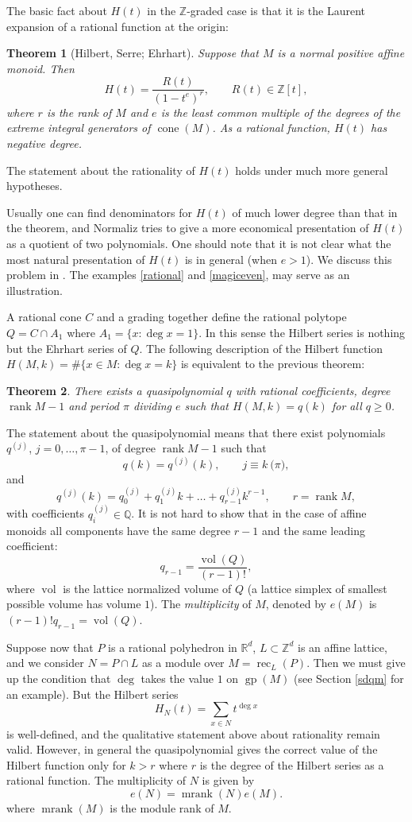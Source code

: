 \documentclass[12pt,a4paper]{scrartcl}
\newtheorem{theorem}{Theorem}
\theoremstyle{definition}
\def\ZZ{{\mathbb Z}}
\def\QQ{{\mathbb Q}}
\def\RR{{\mathbb R}}
\DeclareMathOperator{\gp}{gp}
\DeclareMathOperator{\rank}{rank}
\DeclareMathOperator{\cone}{cone}
\DeclareMathOperator{\rec}{rec}
\DeclareMathOperator{\mrank}{mrank}
\DeclareMathOperator{\vol}{vol}
\begin{document}
The basic fact about $H(t)$ in the $\ZZ$-graded case is that it
is the Laurent expansion of a rational function at the origin:
\begin{theorem}[Hilbert, Serre; Ehrhart]
	Suppose that $M$ is a normal positive affine monoid. Then
	$$
	H(t)=\frac{R(t)}{(1-t^e)^r},\qquad R(t)\in\ZZ[t], %
	$$
	where $r$ is the rank of $M$ and $e$ is the least common multiple
	of the degrees of the extreme integral generators of $\cone(M)$. As a rational function, $H(t)$ has negative degree.
\end{theorem}

The statement about the rationality of $H(t)$ holds under much more general hypotheses.

Usually one can find denominators for $H(t)$ of much lower
degree than that in the theorem, and Normaliz tries to
give a more economical presentation of $H(t)$ as a quotient of
two polynomials. One should note that it is not clear what the
most natural presentation of $H(t)$ is in general (when $e>1$).
We discuss this problem in \cite[Section 4]{BIS}. The examples \ref{rational} and \ref{magiceven}, may serve as
an illustration.

A rational cone $C$ and a grading together define the rational
polytope $Q=C\cap A_1$ where $A_1=\{x:\deg x=1\}$. In this
sense the Hilbert series is nothing but the Ehrhart series of
$Q$.
The following description of the Hilbert function $H(M,k)=\#\{x\in M: \deg x=k\}$ is equivalent to the previous theorem:

\begin{theorem}
	There exists a quasipolynomial $q$ with rational coefficients, degree $\rank M-1$ and period $\pi$ dividing $e$ such that $H(M,k)=q(k)$ for all $q\ge0$.
\end{theorem}

The statement about the quasipolynomial means that there exist
polynomials $q^{(j)}$, $j=0,\dots,\pi-1$, of degree $\rank M-1$ such that
$$
q(k)=q^{(j)}(k),\qquad j\equiv k\pod \pi,
$$
and
$$
q^{(j)}(k)=q^{(j)}_0+q^{(j)}_1k+\dots+q^{(j)}_{r-1}k^{r-1},\qquad r=\rank M,
$$
with coefficients $q^{(j)}_i\in \QQ$. It is not hard to show that in the case of affine monoids all components have the same degree $r-1$ and the same leading coefficient:
$$
q_{r-1}=\frac{\vol(Q)}{(r-1)!},
$$
where $\vol$ is the lattice normalized volume of $Q$ (a lattice simplex of smallest possible volume has volume $1$). The \emph{multiplicity} of $M$, denoted by $e(M)$ is $(r-1)!q_{r-1}=\vol(Q)$.

Suppose now that $P$ is a rational polyhedron in $\RR^d$, $L\subset\ZZ^d$ is an affine lattice, and we consider $N=P\cap L$ as a module over $M=\rec_L(P)$. Then we must give up the condition that $\deg$ takes the value $1$ on $\gp(M)$ (see Section \ref{sdqm} for an example). But the Hilbert series
$$
H_N(t)=\sum_{x\in N} t^{\deg x}
$$
is well-defined, and the qualitative statement above about rationality remain valid. However, in general the quasipolynomial gives the correct value of the Hilbert function only for $k>r$ where $r$ is the degree of the Hilbert series as a rational function. The multiplicity of $N$ is given by
$$
e(N)=\mrank(N)e(M).
$$
where $\mrank(M)$ is the module rank of $M$.
\end{document}
